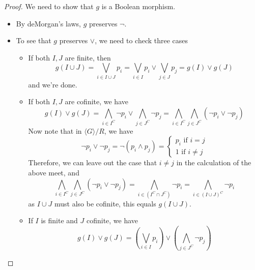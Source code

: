 \documentclass{../util/zariski-small}
\begin{document}
\begin{example}
\begin{proof}
  We need to show that $g$ is a Boolean morphism. 
  \begin{itemize}
    \item By deMorgan's laws, $g$ preserves $\neg$. 
    \item To see that $g$ preserves $\vee$, we need to check three cases
      \begin{itemize}
        \item If both $I,J$ are finite, then 
        \begin{equation} 
          g(I \cup J) = \bigvee_{i\in I \cup J} p_i= \bigvee_{i\in I} p_i \vee \bigvee_{j\in J} p_j 
          = g(I) \vee g(J)
        \end{equation}
        and we're done. 
      \item If both $I,J$ are cofinite, we have
        \begin{equation}
          g(I) \vee g(J) = 
          \bigwedge_{i \in I^C} \neg p_i \vee 
          \bigwedge_{j \in J^C} \neg p_j 
          = 
          \bigwedge_{i\in I^C} 
          \bigwedge_{j \in J^C}(\neg p_i \vee  \neg p_j) 
        \end{equation}
        Now note that in $\langle G \rangle / R$, we have 
        \begin{equation}
          \neg p_i \vee \neg p_j = \neg ( p_i \wedge p_j) = 
          \begin{cases}
            p_i \text{ if } i = j\\
            1 \text{ if } i \neq j  
          \end{cases}
        \end{equation}
        Therefore, we can leave out the case that $i\neq j$ in the calculation of the above meet, and
        \begin{equation}
          \bigwedge_{i\in I^C} 
          \bigwedge_{j \in J^C}(\neg p_i \vee  \neg p_j)  
          = 
          \bigwedge_{i \in (I^C \cap J^C)} \neg p_i
          = 
          \bigwedge_{i \in (I \cup J)^C} \neg p_i 
        \end{equation}
        as $I\cup J$ must also be cofinite, this equals 
          $ g( I \cup J)$. 
        \item If $I$ is finite and $J$ cofinite, we have 
          \begin{equation}
            g(I) \vee g(J) 
            = (\bigvee_{i\in I} p_i) \vee (\bigwedge_{j \in J^C} \neg p_j)
          \end{equation}




\end{itemize}
\end{itemize}
\end{proof}
\end{example}
\end{document}
